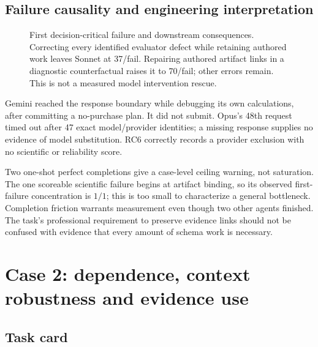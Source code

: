 \documentclass[11pt,a4paper]{article}
\begin{document}
\subsection{Failure causality and engineering interpretation}

\begin{figure}[H]\centering
{}
\caption{First decision-critical failure and downstream consequences. Correcting every identified evaluator defect while retaining authored work leaves Sonnet at 37/fail. Repairing authored artifact links in a diagnostic counterfactual raises it to 70/fail; other errors remain. This is not a measured model intervention rescue.}
\end{figure}

Gemini reached the response boundary while debugging its own calculations, after committing a no-purchase plan. It did not submit. Opus's 48th request timed out after 47 exact model/provider identities; a missing response supplies no evidence of model substitution. RC6 correctly records a provider exclusion with no scientific or reliability score.

Two one-shot perfect completions give a case-level ceiling warning, not saturation. The one scoreable scientific failure begins at artifact binding, so its observed first-failure concentration is $1/1$; this is too small to characterize a general bottleneck. Completion friction warrants measurement even though two other agents finished. The task's professional requirement to preserve evidence links should not be confused with evidence that every amount of schema work is necessary.

\section{Case 2: dependence, context robustness and evidence use}
\subsection{Task card}
\end{document}
